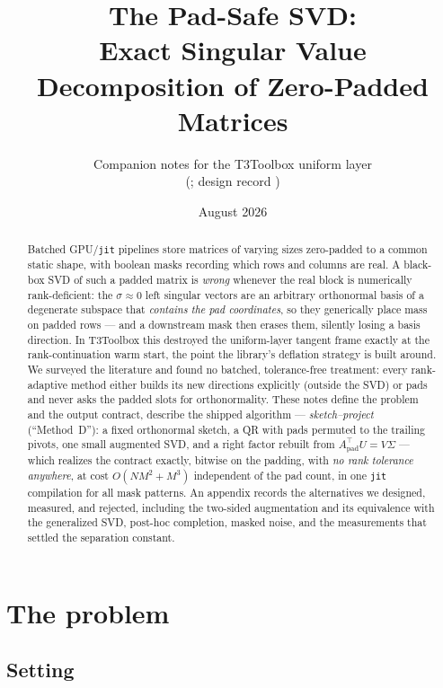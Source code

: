 \documentclass[11pt]{article}
\title{The Pad-Safe SVD:\\Exact Singular Value Decomposition of Zero-Padded Matrices}
\author{Companion notes for the T3Toolbox uniform layer\\
\small (\code{t3toolbox.backend.linalg.pad\_safe\_svd}; design record
\code{dev/review\_2026-08-22/repros/S1b/})}
\date{August 2026}
\theoremstyle{definition}
\theoremstyle{remark}
\newcommand{\Apad}{A_{\mathrm{pad}}}
\newcommand{\code}[1]{\texttt{#1}}
\begin{document}
\maketitle

\begin{abstract}
\noindent
Batched GPU/\code{jit} pipelines store matrices of varying sizes zero-padded to a common static
shape, with boolean masks recording which rows and columns are real. A black-box SVD of such a
padded matrix is \emph{wrong} whenever the real block is numerically rank-deficient: the
$\sigma\approx 0$ left singular vectors are an arbitrary orthonormal basis of a degenerate subspace
that \emph{contains the pad coordinates}, so they generically place mass on padded rows --- and a
downstream mask then erases them, silently losing a basis direction. In T3Toolbox this destroyed
the uniform-layer tangent frame exactly at the rank-continuation warm start, the point the library's
deflation strategy is built around. We surveyed the literature and found no batched, tolerance-free
treatment: every rank-adaptive method either builds its new directions explicitly (outside the SVD)
or pads and never asks the padded slots for orthonormality. These notes define the problem and the
output contract, describe the shipped algorithm --- \emph{sketch--project} (``Method~D''): a fixed
orthonormal sketch, a QR with pads permuted to the trailing pivots, one small augmented SVD, and a
right factor rebuilt from $\Apad^{\top}U = V\Sigma$ --- which realizes the contract exactly,
bitwise on the padding, with \emph{no rank tolerance anywhere}, at cost $O(NM^2+M^3)$ independent
of the pad count, in one \code{jit} compilation for all mask patterns. An appendix records the
alternatives we designed, measured, and rejected, including the two-sided augmentation and its
equivalence with the generalized SVD, post-hoc completion, masked noise, and the measurements that
settled the separation constant.
\end{abstract}

\tableofcontents

\section{The problem}\label{sec:problem}

\subsection{Setting}
\end{document}
